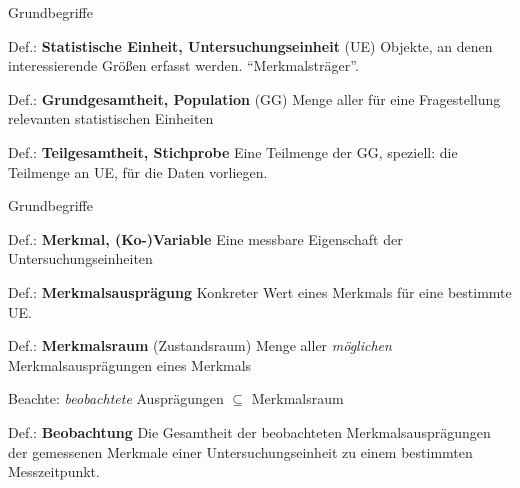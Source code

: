 \documentclass[
  10pt,
  ignorenonframetext,
]{beamer}
\begin{document}
\begin{frame}{Grundbegriffe}
\protect\hypertarget{grundbegriffe}{}
\begin{block}{Def.: \textbf{Statistische Einheit, Untersuchungseinheit}
(UE)}
\protect\hypertarget{def.-statistische-einheit-untersuchungseinheit-ue}{}
Objekte, an denen interessierende Größen erfasst werden.
``Merkmalsträger''.
\end{block}

\begin{block}{Def.: \textbf{Grundgesamtheit, Population} (GG)}
\protect\hypertarget{def.-grundgesamtheit-population-gg}{}
Menge aller für eine Fragestellung relevanten statistischen Einheiten
\end{block}

\begin{block}{Def.: \textbf{Teilgesamtheit, Stichprobe}}
\protect\hypertarget{def.-teilgesamtheit-stichprobe}{}
Eine Teilmenge der GG, speziell: die Teilmenge an UE, für die Daten
vorliegen.
\end{block}
\end{frame}

\begin{frame}{Grundbegriffe}
\protect\hypertarget{grundbegriffe-1}{}
\begin{block}{Def.: \textbf{Merkmal, (Ko-)Variable}}
\protect\hypertarget{def.-merkmal-ko-variable}{}
Eine messbare Eigenschaft der Untersuchungseinheiten
\end{block}

\begin{block}{Def.: \textbf{Merkmalsausprägung}}
\protect\hypertarget{def.-merkmalsauspruxe4gung}{}
Konkreter Wert eines Merkmals für eine bestimmte UE.
\end{block}

\begin{block}{Def.: \textbf{Merkmalsraum} (Zustandsraum)}
\protect\hypertarget{def.-merkmalsraum-zustandsraum}{}
Menge aller \emph{möglichen} Merkmalsausprägungen eines Merkmals
\end{block}

Beachte: \emph{beobachtete} Ausprägungen \(\subseteq\) Merkmalsraum

\begin{block}{Def.: \textbf{Beobachtung}}
\protect\hypertarget{def.-beobachtung}{}
Die Gesamtheit der beobachteten Merkmalsausprägungen der gemessenen
Merkmale einer Untersuchungseinheit zu einem bestimmten Messzeitpunkt.
\end{block}

\end{frame}
\end{document}
